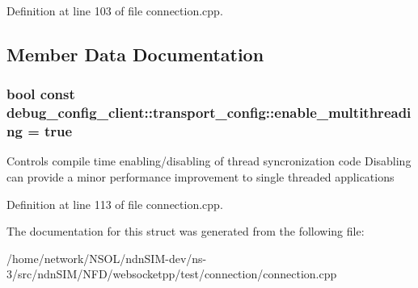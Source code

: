 Definition at line 103 of file connection.\+cpp.



\subsection{Member Data Documentation}
\subsubsection[{\texorpdfstring{enable\+\_\+multithreading}{enable\_multithreading}}]{\setlength{\rightskip}{0pt plus 5cm}bool const debug\+\_\+config\+\_\+client\+::transport\+\_\+config\+::enable\+\_\+multithreading = true\hspace{0.3cm}{\ttfamily [static]}}\hypertarget{structdebug__config__client_1_1transport__config_ac6bf68dc4640a580404ffe36fab45736}{}\label{structdebug__config__client_1_1transport__config_ac6bf68dc4640a580404ffe36fab45736}
Controls compile time enabling/disabling of thread syncronization code Disabling can provide a minor performance improvement to single threaded applications 

Definition at line 113 of file connection.\+cpp.



The documentation for this struct was generated from the following file\+:\begin{DoxyCompactItemize}
\item 
/home/network/\+N\+S\+O\+L/ndn\+S\+I\+M-\/dev/ns-\/3/src/ndn\+S\+I\+M/\+N\+F\+D/websocketpp/test/connection/connection.\+cpp\end{DoxyCompactItemize}
